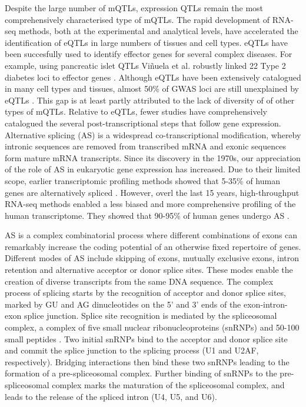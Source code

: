 Despite the large number of mQTLs, expression QTLs remain the most comprehensively characterised type of mQTLs. The rapid development of RNA-seq methods, both at the experimental and analytical levels, have accelerated the identification of eQTLs in large numbers of tissues and cell types. eQTLs have been succesfully used to identify effector genes for several complex diseases. For example, using pancreatic islet QTLs Viñuela et al. robustly linked 22 Type 2 diabetes loci to effector genes \cite{Vinuela2020-ce}. Although eQTLs have been extensively catalogued in many cell types and tissues, almost 50\% of GWAS loci are still unexplained by eQTLs \cite{Mountjoy2021-fc}. This gap is at least partly attributed to the lack of diversity of of other types of mQTLs. Relative to eQTLs, fewer studies have comprehensively catalogued the several post-transcriptional steps that follow gene expression.\\

Alternative splicing (AS) is a widespread co-transcriptional modification, whereby intronic sequences are removed from transcribed mRNA and exonic sequences form mature mRNA transcripts. Since its discovery in the 1970s, our appreciation of the role of AS in eukaryotic gene expression has increased. Due to their limited scope, earlier transcriptomic profiling methods showed that 5-35\% of human genes are alternatively spliced \cite{Sharp1994-nz,Mironov1999-qo}. However, overl the last 15 years, high-throughput RNA-seq methods enabled a less biased and more comprehensive profiling of the human transcriptome. They showed that 90-95\% of human genes undergo AS \cite{Pan2008-qe}. 

AS is a complex combinatorial process where different combinations of exons can remarkably increase the coding potential of an otherwise fixed repertoire of genes. Different modes of AS include skipping of exons, mutually exclusive exons, intron retention and alternative acceptor or donor splice sites. These modes enable the creation of diverse transcripts from the same DNA sequence. The complex process of splicing starts by the recognition of acceptor and donor splice sites, marked by GU and AG dinucleotides on the 5' and 3' ends of the exon-intron-exon splice junction. Splice site recognition is mediated by the spliceosomal complex, a complex of five small nuclear ribonucleoproteins (snRNPs) and 50-100 small peptides \cite{Kramer1996-qj}. Two initial snRNPs bind to the acceptor and donor splice site and commit the splice junction to the splicing process (U1 and U2AF, respectively). Bridging interactions then bind these two snRNPs leading to the formation of a pre-spliceosomal complex. Further binding of snRNPs to the pre-spliceosomal complex marks the maturation of the spliceosomal complex, and leads to the release of the spliced intron (U4, U5, and U6).\\

